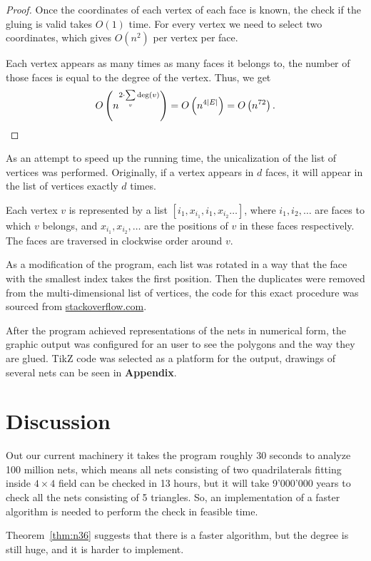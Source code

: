 \documentclass[a4paper,11pt]{article}
\begin{document}
\begin{proof}
	Once the coordinates of each vertex of each face is known, the check if the gluing is valid takes $O(1)$ time. For every vertex we need to select two coordinates, which gives $O(n^2)$ per vertex per face.

	Each vertex appears as many times as many faces it belongs to, the number of those faces is equal to the degree of the vertex. Thus, we get
	\[ O \left( n^{2 \cdot \sum\limits_v \deg (v)} \right)
		= O \left( n^{4 |E|} \right)
		= O \left( n^{72} \right) . \]
\end{proof}

As an attempt to speed up the running time, the unicalization of the list of vertices was performed. Originally, if a vertex appears in $d$ faces, it will appear in the list of vertices exactly $d$ times.

Each vertex $v$ is represented by a list $\left[ i_1, x_{i_1}, i_1, x_{i_2} \ldots \right]$, where $i_1, i_2, \ldots$ are faces to which $v$ belongs, and $x_{i_1}, x_{i_2}, \ldots$ are the positions of $v$ in these faces respectively. The faces are traversed in clockwise order around $v$.

As a modification of the program, each list was rotated in a way that the face with the smallest index takes the first position. Then the duplicates were removed from the multi-dimensional list of vertices, the code for this exact procedure was sourced from \url{stackoverflow.com}.

After the program achieved representations of the nets in numerical form, the graphic output was configured for an user to see the polygons and the way they are glued. TikZ code was selected as a platform for the output, drawings of several nets can be seen in {\bf Appendix}.

\section{Discussion}

Out our current machinery it takes the program roughly 30 seconds to analyze 100 million nets, which means all nets consisting of two quadrilaterals fitting inside $4 \times 4$ field can be checked in 13 hours, but it will take 9'000'000 years to check all the nets consisting of 5 triangles. So, an implementation of a faster algorithm is needed to perform the check in feasible time.

Theorem~\ref{thm:n36} suggests that there is a faster algorithm, but the degree is still huge, and it is harder to implement.
\end{document}
